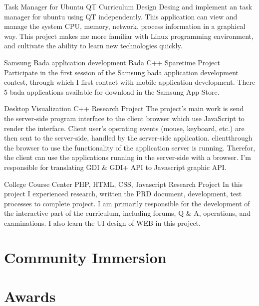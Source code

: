 \documentclass[11pt,a4paper]{moderncv}
\begin{document}
\vspace*{0.2\baselineskip}
{Task Manager for Ubuntu}
{QT}
{Curriculum Design}{}
{
Desing and implement an task manager for ubuntu using QT independently. This application can view and manage
the system CPU, memory, network, process information  in a graphical way. This project makes me more familiar
with Linux programming environment, and cultivate the ability to learn new technologies quickly.
}

\vspace*{0.2\baselineskip}
{Samsung Bada application development}
{Bada C++}
{Sparetime Project}{}
{Participate in the first session of the Samsung bada application development contest, through which I first contact with mobile
application development. There 5 bada applications available for download in the Samsung App Store.
}

\vspace*{0.2\baselineskip}
{Desktop Visualization}
{C++}
{Research Project}{}
{The project's main work is send the server-side program interface to the client browser which use JavaScript to render the interface. 
Client user's operating events (mouse, keyboard, etc.) are then sent to the server-side, handled by the server-side application.
clientthrough the browser to use the functionality of the application server is running. Therefor, the client can use the
applications running in the server-side with a browser. I'm responsible for translating GDI \& GDI+ API to Javascript graphic API.
}

\vspace*{0.2\baselineskip}
{College Course Center}
{PHP, HTML, CSS, Javascript}
{Research Project}{}
{
In this project I experienced research, written the PRD document, development, test processes to complete project. 
I am primarily responsible for the development of the interactive part of the curriculum, including forums, Q \& A,
operations, and examinations. I also learn the UI design of WEB in this project.
}


\section{Community Immersion}

\section{Awards}
\end{document}
